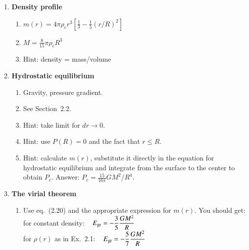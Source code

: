 \documentclass[11pt,a4paper]{report}
\begin{document}

\begin{enumerate}

\item {\bf Density profile}
  \begin{enumerate}
    \item $m(r) = 4\pi\rho_cr^3[\frac{1}{3} - \frac{1}{5}(r/R)^2]$
    \item $M = \frac{8}{15} \pi \rho_c R^3$ 
    \item Hint: density = mass/volume
 \end{enumerate}

  
\item {\bf Hydrostatic equilibrium}

 \begin{enumerate}
    
 \item Gravity, pressure gradient.

 \item See Section~2.2.
   
 \item Hint: take limit for $dr \rightarrow 0$.
   
 \item Hint: use $P(R) = 0$ and the fact that $r \leq R$.
   
 \item Hint: calculate $m(r)$, substitute it directly in the equation
   for hydrostatic equilibrium and integrate from the surface to the
   center to obtain $P_c$. Answer: $P_c = \frac{15}{16\pi} GM^2/R^4$.
   
 \end{enumerate}


\item {\bf The virial theorem}  

  \begin{enumerate}

  \item Use eq.~(2.20) and the appropriate expression for $m(r)$.
    You should get: \\[1ex]
    for constant density: ~ 
    $E_{\rm gr} = \displaystyle -\frac{3}{5} \frac{G M^2}{R}$ \\[1ex]
    for $\rho(r)$ as in Ex.~2.1: ~
    $E_{\rm gr} = \displaystyle -\frac{5}{7} \frac{G M^2}{R}$

    

\end{enumerate}
\end{enumerate}
\end{document}
